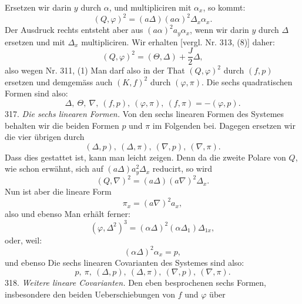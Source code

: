 Ersetzen wir darin $y$ durch $\alpha$, und multipliciren mit $\alpha_x$, so kommt:
\[
(Q,\varphi)^2 = (a\Delta)(a\alpha)^2\Delta_x\alpha_x.
\]
Der Ausdruck rechts entsteht aber aus $(a\alpha)^2a_y\alpha_x$, wenn wir darin $y$ durch $\Delta$ ersetzen und mit $\Delta_x$ multipliciren. Wir erhalten [vergl. Nr. 313, (8)] daher:
\[
(Q,\varphi)^2 = (\Theta,\Delta) + \frac{J}{2}\Delta,
\]
also wegen Nr. 311, (1)
Man darf also in der That $(Q,\varphi)^2$ durch $(f,p)$ ersetzen und demgemäss auch $(K,f)^2$ durch $(\varphi,\pi)$. Die sechs quadratischen Formen sind also:
\[
\Delta,\ \Theta,\ \nabla,\ (f,p),\ (\varphi,\pi),\ (f,\pi) = -(\varphi,p).
\]
317. \textit{Die sechs linearen Formen.} Von den sechs linearen Formen des Systemes behalten wir die beiden Formen $p$ und $\pi$ im Folgenden bei. Dagegen ersetzen wir die vier übrigen durch
\[
(\Delta,p),\ (\Delta,\pi),\ (\nabla,p),\ (\nabla,\pi).
\]
Dass dies gestattet ist, kann man leicht zeigen. Denn da die zweite Polare von $Q$, wie schon erwähnt, sich auf $(a\Delta)a_y^2\Delta_x$ reducirt, so wird
\[
(Q,\nabla)^2 = (a\Delta)(a\nabla)^2\Delta_x.
\]
Nun ist aber die lineare Form
\[
\pi_x = (a\nabla)^2a_x,
\]
also
und ebenso
Man erhält ferner:
\[
(\varphi,\Delta^2)^3 = (\alpha\Delta)^2(\alpha\Delta_1)\Delta_{1x},
\]
oder, weil:
\[
(\alpha\Delta)^2\alpha_x = p,
\]
und ebenso
Die sechs linearen Covarianten des Systemes sind also:
\[
p,\ \pi,\ (\Delta,p),\ (\Delta,\pi),\ (\nabla,p),\ (\nabla,\pi).
\]
318. \textit{Weitere lineare Covarianten.} Den eben besprochenen sechs Formen, insbesondere den beiden Ueberschiebungen von $f$ und $\varphi$ über



